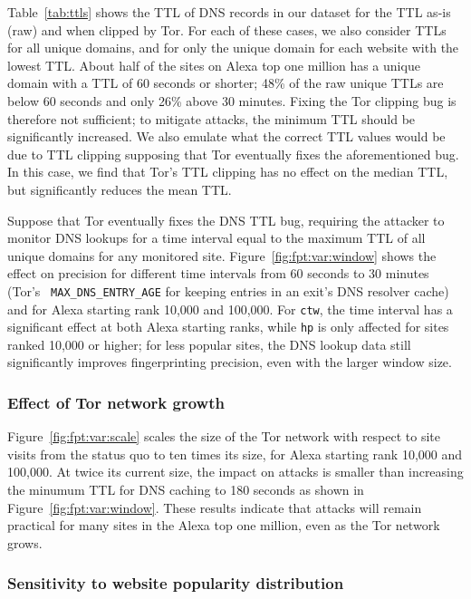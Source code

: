Table~\ref{tab:ttls} shows the TTL of DNS records in our dataset for the
TTL as-is (raw) and when clipped by Tor.  For each of these cases, we
also consider TTLs for all unique domains, and for only the unique
domain for each website with the lowest TTL.  About half of the sites on
Alexa top one million has a unique domain with a TTL of 60 seconds or
shorter; 48\% of the raw unique TTLs are below 60 seconds and only 26\%
above 30 minutes. Fixing the Tor clipping bug is therefore not
sufficient; to mitigate \name attacks, the minimum TTL should be
significantly increased.  We also emulate what the correct TTL values
would be due to TTL clipping supposing that Tor eventually fixes the
aforementioned bug.  In this case, we find that Tor's TTL clipping has
no effect on the median TTL, but significantly reduces the mean TTL.

Suppose that Tor eventually fixes the DNS TTL bug, requiring the
attacker to monitor DNS lookups for a time interval equal to the maximum
TTL of all unique domains for any monitored site.
Figure~\ref{fig:fpt:var:window} shows the effect on precision for
different time intervals from 60 seconds to 30 minutes (Tor's {\tt
  MAX\_DNS\_ENTRY\_AGE} for keeping entries in an exit's DNS resolver
cache) and for Alexa starting rank 10,000 and 100,000. For \texttt{ctw},
the time interval has a significant effect at both Alexa starting ranks,
while \texttt{hp} is only affected for sites ranked 10,000 or higher;
for less popular sites, the DNS lookup data still significantly improves
fingerprinting precision, even with the larger window size.

\subsubsection{Effect of Tor network growth}
Figure~\ref{fig:fpt:var:scale} scales the size of the Tor network with
respect to site
visits from the status quo to ten times its size, for Alexa starting rank 10,000 and
100,000. At twice its current size, the impact on \name attacks is smaller than
increasing the minumum TTL for DNS caching to 180 seconds as shown in
Figure~\ref{fig:fpt:var:window}. These results indicate that \name
attacks will remain
practical for many sites in the Alexa top one million, even as the Tor network grows.


\subsubsection{Sensitivity to website popularity distribution}

